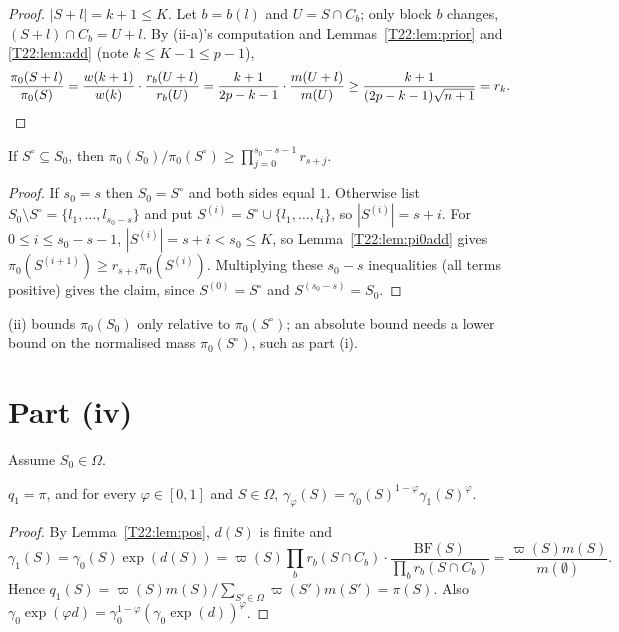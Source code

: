\documentclass[11pt]{report}
\begin{document}
\begin{proof}
$|S+l|=k+1\le K$. Let $b=b(l)$ and $U=S\cap C_b$; only block $b$ changes, $(S+l)\cap C_b=U+l$. By (ii-a)'s computation and Lemmas~\ref{T22:lem:prior} and \ref{T22:lem:add} (note $k\le K-1\le p-1$),
\[
\frac{\pi_0(S+l)}{\pi_0(S)}=\frac{w(k+1)}{w(k)}\cdot\frac{r_b(U+l)}{r_b(U)}=\frac{k+1}{2p-k-1}\cdot\frac{m(U+l)}{m(U)}\ge\frac{k+1}{(2p-k-1)\sqrt{n+1}}=r_k.\qedhere
\]
\end{proof}

\begin{T22proposition}[(ii-b)]
If $S^\circ\subseteq S_0$, then $\pi_0(S_0)/\pi_0(S^\circ)\ge\prod_{j=0}^{s_0-s-1}r_{s+j}$.
\end{T22proposition}

\begin{proof}
If $s_0=s$ then $S_0=S^\circ$ and both sides equal $1$. Otherwise list $S_0\setminus S^\circ=\{l_1,\dots,l_{s_0-s}\}$ and put $S^{(i)}=S^\circ\cup\{l_1,\dots,l_i\}$, so $|S^{(i)}|=s+i$. For $0\le i\le s_0-s-1$, $|S^{(i)}|=s+i<s_0\le K$, so Lemma~\ref{T22:lem:pi0add} gives $\pi_0(S^{(i+1)})\ge r_{s+i}\pi_0(S^{(i)})$. Multiplying these $s_0-s$ inequalities (all terms positive) gives the claim, since $S^{(0)}=S^\circ$ and $S^{(s_0-s)}=S_0$.
\end{proof}

\begin{T22remark}
(ii) bounds $\pi_0(S_0)$ only relative to $\pi_0(S^\circ)$; an absolute bound needs a lower bound on the normalised mass $\pi_0(S^\circ)$, such as part (i).
\end{T22remark}

\section{Part (iv)}

Assume $S_0\in\Omega$.

\begin{T22lemma}\label{T22:lem:bridge}
$q_1=\pi$, and for every $\varphi\in[0,1]$ and $S\in\Omega$, $\gamma_\varphi(S)=\gamma_0(S)^{1-\varphi}\gamma_1(S)^{\varphi}$.
\end{T22lemma}

\begin{proof}
By Lemma~\ref{T22:lem:pos}, $d(S)$ is finite and
\[
\gamma_1(S)=\gamma_0(S)\exp(d(S))=\varpi(S)\prod_br_b(S\cap C_b)\cdot\frac{\mathrm{BF}(S)}{\prod_br_b(S\cap C_b)}=\frac{\varpi(S)m(S)}{m(\emptyset)} .
\] Hence $q_1(S)=\varpi(S)m(S)/\sum_{S'\in\Omega}\varpi(S')m(S')=\pi(S)$. Also $\gamma_0\exp(\varphi d)=\gamma_0^{1-\varphi}(\gamma_0\exp(d))^{\varphi}$.
\end{proof}
\end{document}
